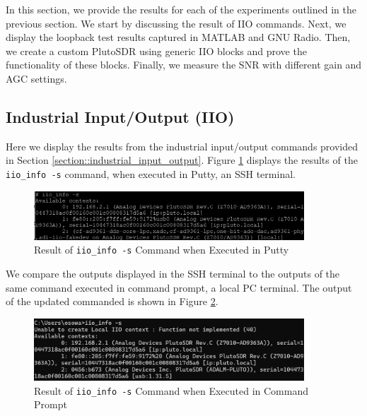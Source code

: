 \documentclass{article}
\begin{document}
In this section, we provide the results for each of the experiments outlined in the previous section. We start by discussing the result of IIO commands. Next, we display the loopback test results captured in MATLAB and GNU Radio. Then, we create a custom PlutoSDR using generic IIO blocks and prove the functionality of these blocks. Finally, we measure the SNR with different gain and AGC settings.

\subsection{Industrial Input/Output (IIO)}

Here we display the results from the industrial input/output commands provided in Section \ref{section::industrial_input_output}. Figure \ref{fig::iio_info_putty} displays the results of the \texttt{iio\_info -s} command, when executed in Putty, an SSH terminal.  

\begin{figure}[H]
	\centerline{\includegraphics[width=0.9\textwidth]{iio_info_putty.png}}
	\caption{Result of \texttt{iio\_info -s} Command when Executed in Putty}
	\label{fig::iio_info_putty}
\end{figure}

We compare the outputs displayed in the SSH terminal to the outputs of the same command executed in command prompt, a local PC terminal. The output of the updated commanded is shown in Figure \ref{fig::iio_info_cmd}.

\begin{figure}[H]
	\centerline{\includegraphics[width=0.9\textwidth]{iio_info_cmd.png}}
	\caption{Result of \texttt{iio\_info -s} Command when Executed in Command Prompt}
	\label{fig::iio_info_cmd}
\end{figure}
\end{document}
